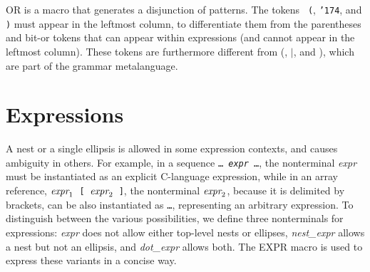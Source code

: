 \documentclass{article}
\newcommand{\mita}[1]{\mbox{\it{{#1}}}}
\newcommand{\mtt}[1]{\mbox{\tt{{#1}}}}
\newcommand{\mth}[1]{\({#1}\)}
\newcommand{\ttmid}{\mbox{\tt \char'174}}
\begin{document}

\noindent
OR is a macro that generates a disjunction of patterns.  The tokens {\tt
(}, {\ttmid}, and {\tt )} must appear in the leftmost column, to
differentiate them from the parentheses and bit-or tokens that can appear
within expressions (and cannot appear in the leftmost column).  These
tokens are furthermore different from (, \(\mid\), and ), which are part of
the grammar metalanguage.

\section{Expressions}

A nest or a single ellipsis is allowed in some expression contexts, and
causes ambiguity in others.  For example, in a sequence \mtt{\ldots
\mita{expr} \ldots}, the nonterminal \mita{expr} must be instantiated as an
explicit C-language expression, while in an array reference,
\mtt{\mth{\mita{expr}_1} \mtt{[} \mth{\mita{expr}_2} \mtt{]}}, the
nonterminal \mth{\mita{expr}_2}, because it is delimited by brackets, can
be also instantiated as \mtt{\ldots}, representing an arbitrary expression.  To
distinguish between the various possibilities, we define three nonterminals
for expressions: {\em expr} does not allow either top-level nests or
ellipses, {\em nest\_expr} allows a nest but not an ellipsis, and {\em
dot\_expr} allows both.  The EXPR macro is used to express these variants
in a concise way.

\end{document}
